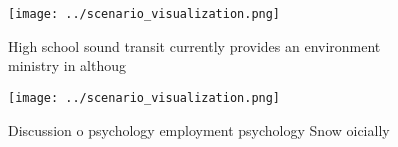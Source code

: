 \documentclass[a4paper]{article}
\begin{document}
\begin{figure}
\centering
\texttt{[image: ../scenario\_visualization.png]}
\caption{High school sound transit currently provides an environment ministry in althoug
}
\end{figure}
 
\begin{figure}
\centering
\texttt{[image: ../scenario\_visualization.png]}
\caption{Discussion o psychology employment psychology Snow oicially
}
\end{figure}
 
\end{document}
